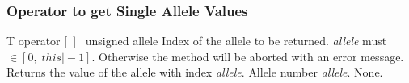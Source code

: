 \subsubsection{Operator to get Single Allele Values}

    \setNormalInstance
    \printMethodWithOneParam
        {T}  
        {operator [\ ]\ } 
        {unsigned}
        {allele} 
        {Index of the allele to be returned. 
         {\em allele} must $\in [0, |this|-1]$.
         Otherwise
         the method will be aborted with an error message.}
        {Returns the value of the allele with index {\em allele}.}
        {Allele number {\em allele}.}
        {None.}

























